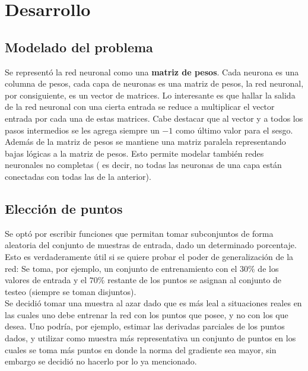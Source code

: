 \documentclass[%
    final,
    reprint,
    notitlepage,
    narroweqnarray,
    inline,
    twoside,
    invited
    ]{ieee}
\begin{document}

\section{Desarrollo}

\subsection{Modelado del problema}

\par Se representó la red neuronal como una \textbf{matriz de pesos}. Cada neurona es una columna de pesos, cada capa de 
neuronas es una matriz de pesos, la red neuronal, por consiguiente, es un vector de matrices. Lo interesante es que hallar 
la salida de la red neuronal con una cierta entrada se reduce a multiplicar el vector entrada por cada una de estas matrices. Cabe destacar 
que al vector y a todos los pasos intermedios se les agrega siempre un $-1$ como último valor para el sesgo.\\
Además de la matriz de pesos se mantiene una matriz paralela representando bajas lógicas a la matriz de pesos. 
Esto permite modelar también redes neuronales no completas ( es decir, no todas las neuronas de una capa 
están conectadas con todas las de la anterior).

\subsection{Elección de puntos}
\par Se optó por escribir funciones que permitan tomar subconjuntos de forma aleatoria del conjunto 
de muestras de entrada, dado un determinado porcentaje. Esto es verdaderamente útil 
si se quiere probar el poder de generalización de la red: Se toma, por ejemplo, un 
conjunto de entrenamiento con el $30\%$ de los valores de entrada y el $70\%$ restante de los puntos 
se asignan al conjunto de testeo (siempre se toman disjuntos). \\
Se decidió tomar una muestra al azar dado que es más leal a situaciones reales en las cuales 
uno debe entrenar la red con los puntos que posee, y no con los que desea. Uno podría, por ejemplo, 
estimar las derivadas parciales de los puntos dados, y utilizar como muestra más representativa 
un conjunto de puntos en los cuales se toma más puntos en donde la norma del gradiente sea mayor, sin embargo 
se decidió no hacerlo por lo ya mencionado.
\end{document}
